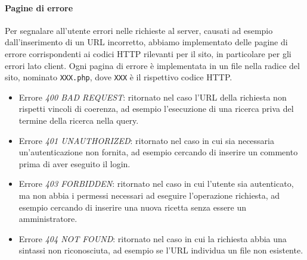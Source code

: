 \paragraph{Pagine di errore}

Per segnalare all'utente errori nelle richieste al server, causati ad esempio dall'inserimento di un URL incorretto, abbiamo implementato delle pagine di errore corrispondenti ai codici HTTP rilevanti per il sito, in particolare per gli errori lato client.
Ogni pagina di errore è implementata in un file nella radice del sito, nominato \texttt{XXX.php}, dove \texttt{XXX} è il rispettivo codice HTTP\@.

\begin{itemize}
	\item Errore \textit{400 BAD REQUEST}: ritornato nel caso l'URL della richiesta non rispetti vincoli di coerenza, ad esempio l'esecuzione di una ricerca priva del termine della ricerca nella query.
	\item Errore \textit{401 UNAUTHORIZED}: ritornato nel caso in cui sia necessaria un'autenticazione non fornita, ad esempio cercando di inserire un commento prima di aver eseguito il login.
	\item Errore \textit{403 FORBIDDEN}: ritornato nel caso in cui l'utente sia autenticato, ma non abbia i permessi necessari ad eseguire l'operazione richiesta, ad esempio cercando di inserire una nuova ricetta senza essere un amministratore.
	\item Errore \textit{404 NOT FOUND}: ritornato nel caso in cui la richiesta abbia una sintassi non riconosciuta, ad esempio se l'URL individua un file non esistente.
\end{itemize}

